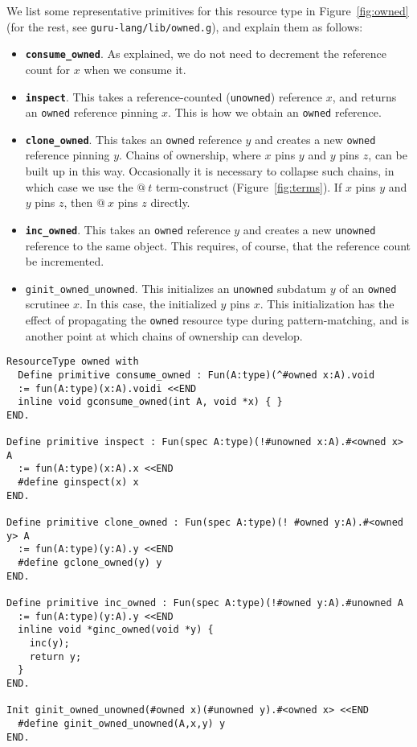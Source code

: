 \documentclass[9pt,natbib]{sigplanconf}
\begin{document}
We list some representative primitives for this resource type in
Figure~\ref{fig:owned} (for the rest, see
\texttt{guru-lang/lib/owned.g}), and explain them as follows:

\begin{itemize}
\item \textbf{\texttt{consume\_owned}}.  As explained, we do not need to 
decrement the reference count for $x$ when we consume it.

\item \textbf{\texttt{inspect}}. This takes a reference-counted
  (\texttt{unowned}) reference $x$, and returns an \texttt{owned}
  reference pinning $x$.  This is how we obtain an \texttt{owned}
  reference.

\item \textbf{\texttt{clone\_owned}}. This takes an \texttt{owned}
  reference $y$ and creates a new \texttt{owned} reference pinning
  $y$.  Chains of ownership, where $x$ pins $y$ and $y$ pins $z$, can
  be built up in this way.  Occasionally it is necessary to collapse
  such chains, in which case we use the $@\ t$ term-construct
  (Figure~\ref{fig:terms}).  If $x$ pins $y$ and $y$ pins $z$, then
  $@\ x$ pins $z$ directly.

\item \textbf{\texttt{inc\_owned}}. This takes an \texttt{owned}
  reference $y$ and creates a new \texttt{unowned} reference to the
  same object.  This requires, of course, that the reference count
  be incremented.

\item \texttt{ginit\_owned\_unowned}. This initializes an
  \texttt{unowned} subdatum $y$ of an \texttt{owned} scrutinee $x$.
  In this case, the initialized $y$ pins $x$.  This initialization has
  the effect of propagating the \texttt{owned} resource type during
  pattern-matching, and is another point at which chains of ownership
  can develop.

\end{itemize}

\begin{figure*}
\small
\begin{verbatim}
ResourceType owned with 
  Define primitive consume_owned : Fun(A:type)(^#owned x:A).void
  := fun(A:type)(x:A).voidi <<END
  inline void gconsume_owned(int A, void *x) { }
END.

Define primitive inspect : Fun(spec A:type)(!#unowned x:A).#<owned x> A 
  := fun(A:type)(x:A).x <<END
  #define ginspect(x) x
END.

Define primitive clone_owned : Fun(spec A:type)(! #owned y:A).#<owned y> A
  := fun(A:type)(y:A).y <<END
  #define gclone_owned(y) y
END.

Define primitive inc_owned : Fun(spec A:type)(!#owned y:A).#unowned A
  := fun(A:type)(y:A).y <<END
  inline void *ginc_owned(void *y) {
    inc(y);
    return y;
  }
END.

Init ginit_owned_unowned(#owned x)(#unowned y).#<owned x> <<END
  #define ginit_owned_unowned(A,x,y) y
END.
\end{verbatim}
\caption{The \texttt{owned} resource type (selected primitives)}
\label{fig:owned}
\end{figure*}
\end{document}
